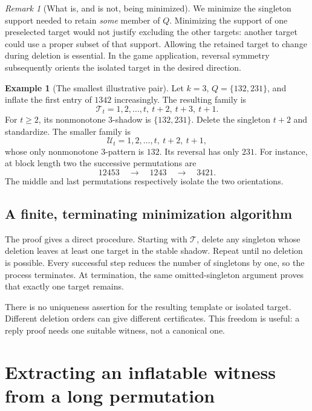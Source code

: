 \documentclass[11pt,a4paper]{article}
\theoremstyle{definition}
\newtheorem{example}[theorem]{Example}
\theoremstyle{remark}
\newtheorem{remark}[theorem]{Remark}
\newcommand{\Tm}{\mathcal T}
\newcommand{\Um}{\mathcal U}
\begin{document}
\begin{remark}[What is, and is not, being minimized]
We minimize the singleton support needed to retain \emph{some} member of
$Q$. Minimizing the support of one preselected target would not justify
excluding the other targets: another target could use a proper subset of
that support. Allowing the retained target to change during deletion is
essential. In the game application, reversal symmetry subsequently orients
the isolated target in the desired direction.
\end{remark}

\begin{example}[The smallest illustrative pair]\label{ex:small}
Let $k=3$, $Q=\{132,231\}$, and inflate the first entry of $1342$ increasingly.
The resulting family is
\[
 \Tm_t=1,2,\ldots,t,\ t+2,\ t+3,\ t+1.
\]
For $t\ge2$, its nonmonotone $3$-shadow is $\{132,231\}$. Delete the
singleton $t+2$ and standardize. The smaller family is
\[
 \Um_t=1,2,\ldots,t,\ t+2,\ t+1,
\]
whose only nonmonotone $3$-pattern is $132$. Its reversal has only $231$.
For instance, at block length two the successive permutations are
\[
 12453\quad\longrightarrow\quad1243
 \quad\longrightarrow\quad3421.
\]
The middle and last permutations respectively isolate the two orientations.
\end{example}

\subsection{A finite, terminating minimization algorithm}
The proof gives a direct procedure. Starting with $\Tm$, delete any singleton
whose deletion leaves at least one target in the stable shadow. Repeat until
no deletion is possible. Every successful step reduces the number of
singletons by one, so the process terminates. At termination, the same
omitted-singleton argument proves that exactly one target remains.

There is no uniqueness assertion for the resulting template or isolated
target. Different deletion orders can give different certificates. This
freedom is useful: a reply proof needs one suitable witness, not a canonical
one.

\section{Extracting an inflatable witness from a long permutation}
\label{sec:extract}
\end{document}

